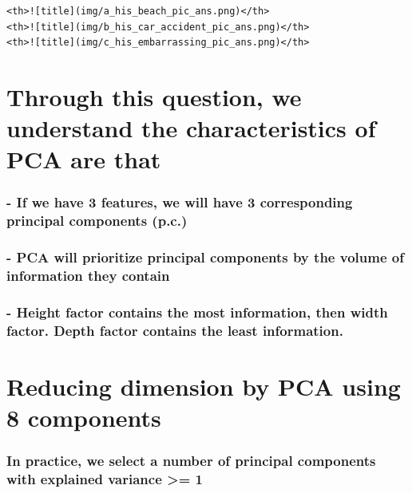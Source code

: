 \documentclass[11pt]{article}
\begin{document}
    \begin{verbatim}
<th>![title](img/a_his_beach_pic_ans.png)</th>
<th>![title](img/b_his_car_accident_pic_ans.png)</th>
<th>![title](img/c_his_embarrassing_pic_ans.png)</th>
\end{verbatim}

    \section{Through this question, we understand the characteristics of PCA
are
that​}\label{through-this-question-we-understand-the-characteristics-of-pca-are-that}

\subsubsection{- If we have 3 features, we will have 3 corresponding
principal components
(p.c.)​}\label{if-we-have-3-features-we-will-have-3-corresponding-principal-components-p.c.}

\subsubsection{- PCA will prioritize principal components by the volume
of information they
contain​}\label{pca-will-prioritize-principal-components-by-the-volume-of-information-they-contain}

\subsubsection{- Height factor contains the most information, then width
factor. Depth factor contains the least
information.​}\label{height-factor-contains-the-most-information-then-width-factor.-depth-factor-contains-the-least-information.}

    \section{Reducing dimension by PCA using 8
components}\label{reducing-dimension-by-pca-using-8-components}

\subsubsection{In practice, we select a number of principal components
with explained variance \textgreater{}=
1}\label{in-practice-we-select-a-number-of-principal-components-with-explained-variance-1}
\end{document}
